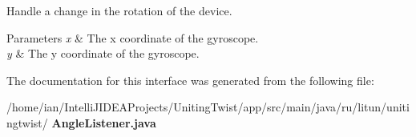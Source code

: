Handle a change in the rotation of the device. 


\begin{DoxyParams}{Parameters}
{\em x} & The x coordinate of the gyroscope. \\
\hline
{\em y} & The y coordinate of the gyroscope. \\
\hline
\end{DoxyParams}


The documentation for this interface was generated from the following file\+:\begin{DoxyCompactItemize}
\item 
/home/ian/\+Intelli\+J\+I\+D\+E\+A\+Projects/\+Uniting\+Twist/app/src/main/java/ru/litun/unitingtwist/\textbf{ Angle\+Listener.\+java}\end{DoxyCompactItemize}
